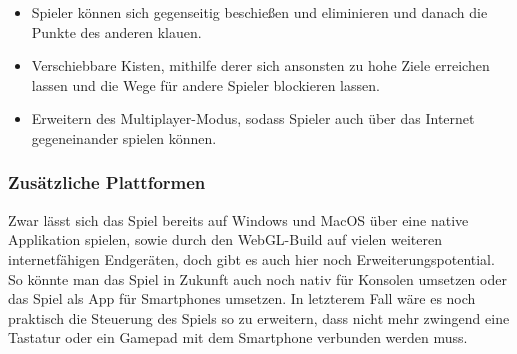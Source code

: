 \begin{itemize}
    \item Spieler können sich gegenseitig beschießen und eliminieren und danach die Punkte des anderen klauen.
    \item Verschiebbare Kisten, mithilfe derer sich ansonsten zu hohe Ziele erreichen lassen und die Wege für andere Spieler blockieren lassen.
    \item Erweitern des Multiplayer-Modus, sodass Spieler auch über das Internet gegeneinander spielen können.
\end{itemize}

\subsubsection*{Zusätzliche Plattformen}

Zwar lässt sich das Spiel bereits auf Windows und MacOS über eine native Applikation spielen, sowie durch den WebGL-Build auf vielen weiteren internetfähigen Endgeräten, doch gibt es auch hier noch Erweiterungspotential. So könnte man das Spiel in Zukunft auch noch nativ für Konsolen umsetzen oder das Spiel als App für Smartphones umsetzen. In letzterem Fall wäre es noch praktisch die Steuerung des Spiels so zu erweitern, dass nicht mehr zwingend eine Tastatur oder ein Gamepad mit dem Smartphone verbunden werden muss. 
